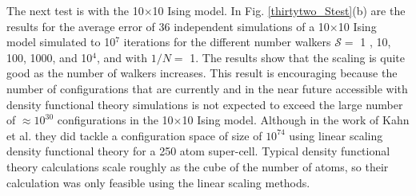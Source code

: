 \documentclass[aps,pre,reprint,superscriptaddress,showkeys]{revtex4-2}
\begin{document}
  The next test is with the 10$\times$10 Ising model. In Fig. \ref{thirtytwo_Stest}(b) are  the results for the average error of 36 independent simulations of a 10$\times$10 Ising model simulated to 10$^7$ iterations for the different number walkers $\mathcal{S}=$ 1 , 10, 100, 1000, and 10$^4$, and  with $1/N=$ 1. The results show that the scaling is quite good as the number of walkers increases. This result is encouraging because the number of configurations that are currently and in the near future accessible with density functional theory simulations is not expected to exceed the large number of $\approx 10^{30}$ configurations in the 10$\times$10 Ising model.  Although in the work of  Kahn et al. \cite{FP_Wang_Landau_CuZn} they did tackle a configuration space of size of $10^{74}$ using linear scaling density functional theory for a 250 atom super-cell. Typical density functional theory calculations scale roughly as the cube of the number of atoms, so their calculation was only feasible using the linear scaling methods.   
\end{document}
